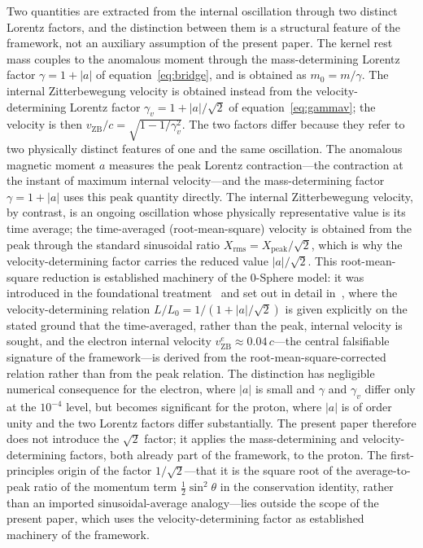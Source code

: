 \documentclass[%
 reprint, amsmath,amssymb, aps, prc, ]{revtex4-2}
\numberwithin{equation}{section}
\newcommand{\vZB}{v_{\text{ZB}}}
\begin{document}
Two quantities are extracted from the internal oscillation through two distinct Lorentz factors, and the distinction between them is a structural feature of the framework, not an auxiliary assumption of the present paper. The kernel rest mass couples to the anomalous moment through the mass-determining Lorentz factor $\gamma = 1 + |a|$ of equation~\eqref{eq:bridge}, and is obtained as $m_0 = m/\gamma$. The internal Zitterbewegung velocity is obtained instead from the velocity-determining Lorentz factor $\gamma_v = 1 + |a|/\sqrt{2}$ of equation~\eqref{eq:gammav}; the velocity is then $\vZB/c = \sqrt{1 - 1/\gamma_v^2}$. The two factors differ because they refer to two physically distinct features of one and the same oscillation. The anomalous magnetic moment $a$ measures the peak Lorentz contraction---the contraction at the instant of maximum internal velocity---and the mass-determining factor $\gamma = 1 + |a|$ uses this peak quantity directly. The internal Zitterbewegung velocity, by contrast, is an ongoing oscillation whose physically representative value is its time average; the time-averaged (root-mean-square) velocity is obtained from the peak through the standard sinusoidal ratio $X_{\text{rms}} = X_{\text{peak}}/\sqrt{2}$, which is why the velocity-determining factor carries the reduced value $|a|/\sqrt{2}$. This root-mean-square reduction is established machinery of the 0-Sphere model: it was introduced in the foundational treatment~\cite{Hanamura10} and set out in detail in~\cite{Hanamura11,Hanamura14}, where the velocity-determining relation $L/L_0 = 1/(1+|a|/\sqrt{2})$ is given explicitly on the stated ground that the time-averaged, rather than the peak, internal velocity is sought, and the electron internal velocity $\vZB^e \approx 0.04\,c$---the central falsifiable signature of the framework---is derived from the root-mean-square-corrected relation rather than from the peak relation. The distinction has negligible numerical consequence for the electron, where $|a|$ is small and $\gamma$ and $\gamma_v$ differ only at the $10^{-4}$ level, but becomes significant for the proton, where $|a|$ is of order unity and the two Lorentz factors differ substantially. The present paper therefore does not introduce the $\sqrt{2}$ factor; it applies the mass-determining and velocity-determining factors, both already part of the framework, to the proton. The first-principles origin of the factor $1/\sqrt{2}$---that it is the square root of the average-to-peak ratio of the momentum term $\tfrac{1}{2}\sin^2\theta$ in the conservation identity, rather than an imported sinusoidal-average analogy---lies outside the scope of the present paper, which uses the velocity-determining factor as established machinery of the framework.
\end{document}
